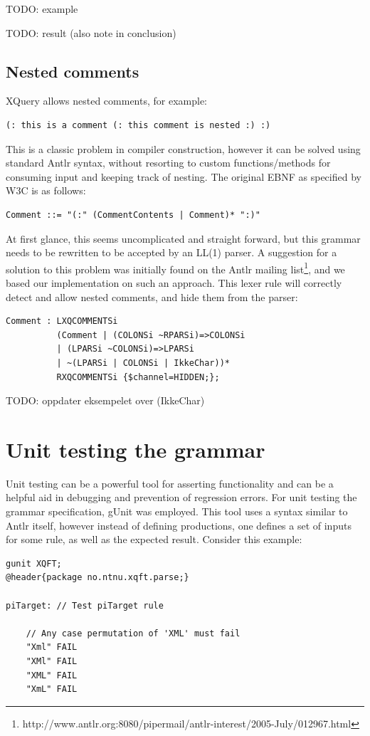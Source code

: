 TODO: example

TODO: result (also note in conclusion)

\subsection{Nested comments}
XQuery allows nested comments, for example:
\begin{verbatim}
(: this is a comment (: this comment is nested :) :)
\end{verbatim}
This is a classic problem in compiler construction, however it can be solved
using standard Antlr syntax, without resorting to custom functions/methods for
consuming input and keeping track of nesting. The original EBNF as specified by
W3C is as follows:
\begin{verbatim}
Comment ::= "(:" (CommentContents | Comment)* ":)"
\end{verbatim}
At first glance, this seems uncomplicated and straight forward, but this grammar
needs to be rewritten to be accepted by an LL(1) parser. A suggestion for a 
solution to this problem was initially found on the Antlr mailing
list\footnote{http://www.antlr.org:8080/pipermail/antlr-interest/2005-July/012967.html},
and we based our implementation on such an approach. This lexer rule will
correctly detect and allow nested comments, and hide them from the parser:
\begin{verbatim}	
Comment : LXQCOMMENTSi 
          (Comment | (COLONSi ~RPARSi)=>COLONSi 
          | (LPARSi ~COLONSi)=>LPARSi 
          | ~(LPARSi | COLONSi | IkkeChar))* 
          RXQCOMMENTSi {$channel=HIDDEN;};
\end{verbatim}
TODO: oppdater eksempelet over (IkkeChar)


\section{Unit testing the grammar}
Unit testing can be a powerful tool for asserting functionality and can be a
helpful aid in debugging and prevention of regression errors.  For unit testing the
grammar specification, gUnit \cite{gunit00} was employed. This tool uses a
syntax similar to Antlr itself, however instead of defining productions, one
defines a set of inputs for some rule, as well as the expected result. Consider
this example:

\begin{verbatim}
gunit XQFT;
@header{package no.ntnu.xqft.parse;}

piTarget: // Test piTarget rule

    // Any case permutation of 'XML' must fail
    "Xml" FAIL
    "XMl" FAIL
    "XML" FAIL
    "XmL" FAIL
\end{verbatim}

